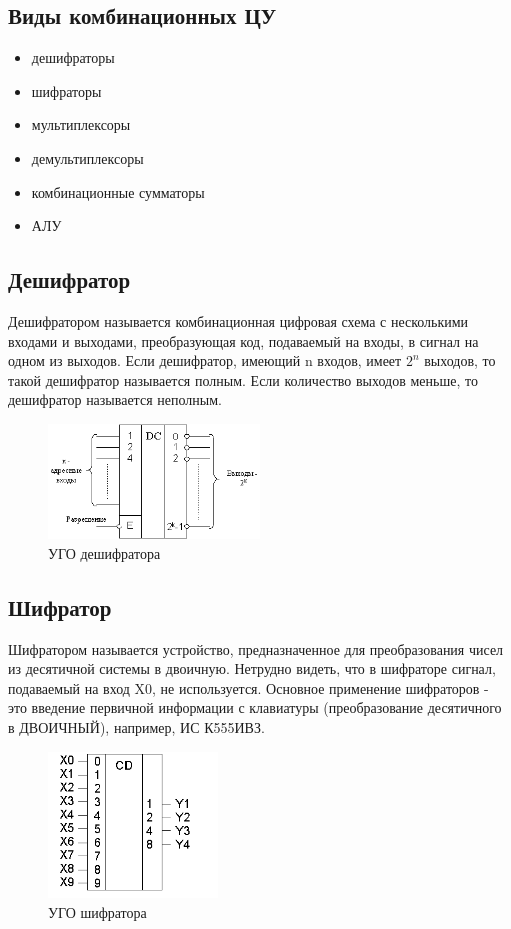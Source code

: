 \documentclass[unicode, 12pt, a4paper, oneside]{article}
\begin{document}
\subsection*{Виды комбинационных ЦУ}
\begin{itemize}
\item дешифраторы
\item шифраторы
\item мультиплексоры
\item демультиплексоры
\item комбинационные сумматоры
\item АЛУ
\end{itemize}


\subsection*{Дешифратор}

Дешифратором называется комбинационная цифровая схема с несколькими входами и выходами, преобразующая код, подаваемый на входы, в сигнал на одном из выходов. Если дешифратор, имеющий n входов, имеет $2^{n}$ выходов, то такой дешифратор называется полным. Если количество выходов меньше, то дешифратор называется неполным.
\begin{figure}[H]
\centering
\includegraphics[width=0.5\textwidth]{11_dc.png}
\caption{УГО дешифратора}
\label{fig:11_dc}
\end{figure}

\subsection*{Шифратор}

Шифратором называется устройство, предназначенное для преобразования чисел из десятичной системы в двоичную. Нетрудно видеть, что в шифраторе сигнал, подаваемый на вход X0, не используется. Основное применение шифраторов - это введение первичной информации с клавиатуры (преобразование десятичного в ДВОИЧНЫЙ), например, ИС К555ИВЗ.
\begin{figure}[H]
\centering
\includegraphics[width=0.4\textwidth]{11_cd.png}
\caption{УГО шифратора}
\label{fig:11_cd}
\end{figure}
\end{document}
